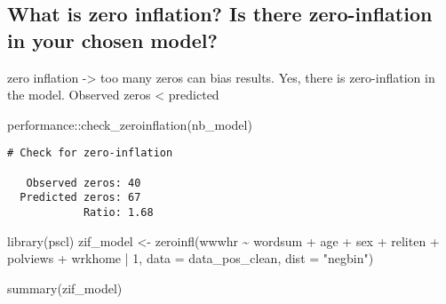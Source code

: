 \documentclass[
  letterpaper,
  DIV=11,
  numbers=noendperiod]{scrartcl}
\newenvironment{Shaded}{\begin{snugshade}}{\end{snugshade}}
\newcommand{\AttributeTok}[1]{\textcolor[rgb]{0.40,0.45,0.13}{#1}}
\newcommand{\DecValTok}[1]{\textcolor[rgb]{0.68,0.00,0.00}{#1}}
\newcommand{\FunctionTok}[1]{\textcolor[rgb]{0.28,0.35,0.67}{#1}}
\newcommand{\NormalTok}[1]{\textcolor[rgb]{0.00,0.23,0.31}{#1}}
\newcommand{\OtherTok}[1]{\textcolor[rgb]{0.00,0.23,0.31}{#1}}
\newcommand{\SpecialCharTok}[1]{\textcolor[rgb]{0.37,0.37,0.37}{#1}}
\newcommand{\StringTok}[1]{\textcolor[rgb]{0.13,0.47,0.30}{#1}}
\begin{document}
\subsection{What is zero inflation? Is there zero-inflation in your
chosen
model?}\label{what-is-zero-inflation-is-there-zero-inflation-in-your-chosen-model}

zero inflation -\textgreater{} too many zeros can bias results. Yes,
there is zero-inflation in the model. Observed zeros \textless{}
predicted

\begin{Shaded}
\begin{Highlighting}[]
\NormalTok{performance}\SpecialCharTok{::}\FunctionTok{check\_zeroinflation}\NormalTok{(nb\_model)}
\end{Highlighting}
\end{Shaded}

\begin{verbatim}
# Check for zero-inflation

   Observed zeros: 40
  Predicted zeros: 67
            Ratio: 1.68
\end{verbatim}

\begin{Shaded}
\begin{Highlighting}[]
\FunctionTok{library}\NormalTok{(pscl)}
\NormalTok{zif\_model }\OtherTok{\textless{}{-}} \FunctionTok{zeroinfl}\NormalTok{(wwwhr }\SpecialCharTok{\textasciitilde{}}\NormalTok{ wordsum }\SpecialCharTok{+}\NormalTok{ age }\SpecialCharTok{+}\NormalTok{ sex }\SpecialCharTok{+}\NormalTok{ reliten }\SpecialCharTok{+}\NormalTok{ polviews }\SpecialCharTok{+}\NormalTok{ wrkhome }\SpecialCharTok{|} \DecValTok{1}\NormalTok{, }
                       \AttributeTok{data =}\NormalTok{ data\_pos\_clean, }\AttributeTok{dist =} \StringTok{"negbin"}\NormalTok{)}

\FunctionTok{summary}\NormalTok{(zif\_model)}
\end{Highlighting}
\end{Shaded}
\end{document}
